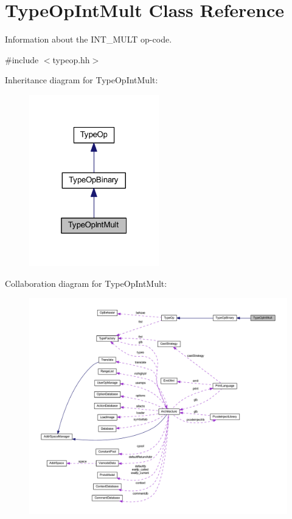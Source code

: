 \hypertarget{class_type_op_int_mult}{}\section{Type\+Op\+Int\+Mult Class Reference}
\label{class_type_op_int_mult}


Information about the I\+N\+T\+\_\+\+M\+U\+LT op-\/code.  




{\ttfamily \#include $<$typeop.\+hh$>$}



Inheritance diagram for Type\+Op\+Int\+Mult\+:
\nopagebreak
\begin{figure}[H]
\begin{center}
\leavevmode
\includegraphics[width=160pt]{class_type_op_int_mult__inherit__graph}
\end{center}
\end{figure}


Collaboration diagram for Type\+Op\+Int\+Mult\+:
\nopagebreak
\begin{figure}[H]
\begin{center}
\leavevmode
\includegraphics[width=350pt]{class_type_op_int_mult__coll__graph}
\end{center}
\end{figure}
